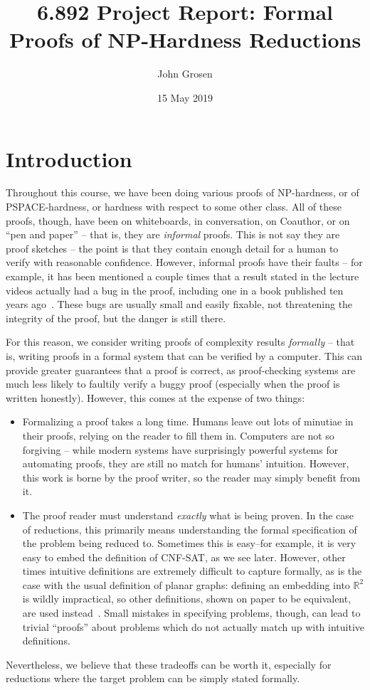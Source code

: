 \documentclass{article}
\title{6.892 Project Report: Formal Proofs of NP-Hardness Reductions}
\author{John Grosen}
\date{15 May 2019}
\begin{document}
\maketitle

\section{Introduction}

Throughout this course, we have been doing various proofs of NP-hardness, or of
PSPACE-hardness, or hardness with respect to some other class. All of these
proofs, though, have been on whiteboards, in conversation, on Coauthor, or on
``pen and paper'' -- that is, they are \emph{informal} proofs. This is not say
they are proof sketches -- the point is that they contain enough detail for a
human to verify with reasonable confidence. However, informal proofs have their
faults -- for example, it has been mentioned a couple times that a result stated
in the lecture videos actually had a bug in the proof, including one in a book
published ten years ago~\cite{c07updates2019}. These bugs are usually small and
easily fixable, not threatening the integrity of the proof, but the danger is
still there.

For this reason, we consider writing proofs of complexity results
\emph{formally} -- that is, writing proofs in a formal system that can be
verified by a computer. This can provide greater guarantees that a proof is
correct, as proof-checking systems are much less likely to faultily verify a
buggy proof (especially when the proof is written honestly). However, this comes
at the expense of two things:
\begin{itemize}
\item Formalizing a proof takes a long time. Humans leave out lots of minutiae
  in their proofs, relying on the reader to fill them in. Computers are not so
  forgiving -- while modern systems have surprisingly powerful systems for
  automating proofs, they are still no match for humans' intuition. However,
  this work is borne by the proof writer, so the reader may simply benefit from
  it.
\item The proof reader must understand \emph{exactly} what is being proven. In
  the case of reductions, this primarily means understanding the formal
  specification of the problem being reduced to. Sometimes this is easy--for
  example, it is very easy to embed the definition of CNF-SAT, as we see later.
  However, other times intuitive definitions are extremely difficult to capture
  formally, as is the case with the usual definition of planar graphs: defining
  an embedding into $\mathbb{R}^2$ is wildly impractical, so other definitions,
  shown on paper to be equivalent, are used instead~\cite{yamamoto1995}. Small
  mistakes in specifying problems, though, can lead to trivial ``proofs'' about
  problems which do not actually match up with intuitive definitions.
\end{itemize}
Nevertheless, we believe that these tradeoffs can be worth it, especially for
reductions where the target problem can be simply stated formally.
\end{document}
